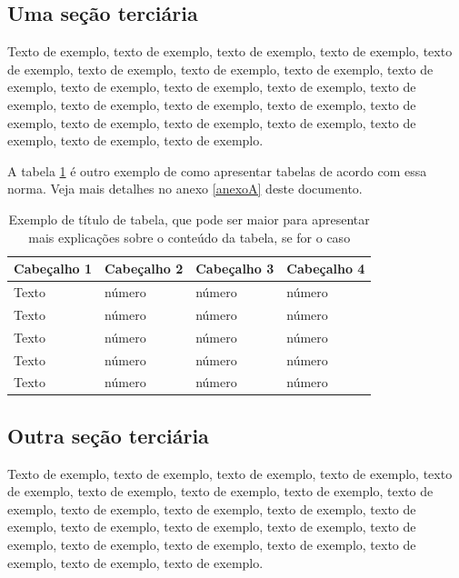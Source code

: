 \documentclass[
	12pt,				%
	oneside,			%
	a4paper,			%
	english,			%
	brazil				%
	]{abntex2ppgsi}
\begin{document}
\subsection{Uma seção terciária}

Texto de exemplo, texto de exemplo, texto de exemplo, texto de exemplo, texto de exemplo, texto de exemplo, texto de exemplo, texto de exemplo, texto de exemplo, texto de exemplo, texto de exemplo, texto de exemplo, texto de exemplo, texto de exemplo, texto de exemplo, texto de exemplo, texto de exemplo, texto de exemplo, texto de exemplo, texto de exemplo, texto de exemplo, texto de exemplo, texto de exemplo.

A tabela \ref{tab:ExemploDeTabela2} é outro exemplo de como apresentar tabelas de acordo com essa norma. Veja mais detalhes no anexo \ref{anexoA} deste documento.

\begin{table}[htbp]
	\centering
	\caption{Exemplo de título de tabela, que pode ser maior para apresentar mais explicações sobre o conteúdo da tabela, se for o caso}
		\begin{tabular}{p{1.2in} p{1.2in} p{1.2in} p{1.2in} } \hline
		
		Cabeçalho 1	& Cabeçalho 2	& Cabeçalho 3	& Cabeçalho 4 \\ \hline
		Texto	& número & número	& número \\ 
		Texto	& número & número	& número \\ 
		Texto	& número & número	& número \\ 
		Texto	& número & número	& número \\ 
		Texto	& número & número	& número \\ \hline
			
		\end{tabular}
	\label{tab:ExemploDeTabela2}
\end{table}

\subsection{Outra seção terciária}

Texto de exemplo, texto de exemplo, texto de exemplo, texto de exemplo, texto de exemplo, texto de exemplo, texto de exemplo, texto de exemplo, texto de exemplo, texto de exemplo, texto de exemplo, texto de exemplo, texto de exemplo, texto de exemplo, texto de exemplo, texto de exemplo, texto de exemplo, texto de exemplo, texto de exemplo, texto de exemplo, texto de exemplo, texto de exemplo, texto de exemplo.
\end{document}
